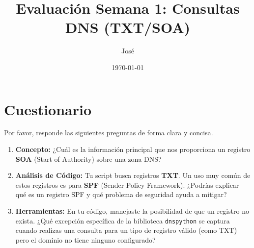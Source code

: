 \documentclass{article}
\title{Evaluación Semana 1: Consultas DNS (TXT/SOA)}
\author{José}
\date{\today}
\begin{document}
\maketitle

\section*{Cuestionario}

Por favor, responde las siguientes preguntas de forma clara y concisa.

\begin{enumerate}
    \item \textbf{Concepto:} ¿Cuál es la información principal que nos proporciona un registro \textbf{SOA} (Start of Authority) sobre una zona DNS?

    \item \textbf{Análisis de Código:} Tu script busca registros \textbf{TXT}. Un uso muy común de estos registros es para \textbf{SPF} (Sender Policy Framework). ¿Podrías explicar qué es un registro SPF y qué problema de seguridad ayuda a mitigar?

    \item \textbf{Herramientas:} En tu código, manejaste la posibilidad de que un registro no exista. ¿Qué excepción específica de la biblioteca \texttt{dnspython} se captura cuando realizas una consulta para un tipo de registro válido (como TXT) pero el dominio no tiene ninguno configurado?

\end{enumerate}
\end{document}
